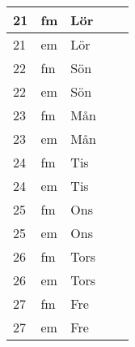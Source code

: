 \documentclass[a4paper]{article}
\begin{document}
\begin{table}[ht!]
\begin{tabular}{lllp{7cm}p{7cm}}
\multicolumn{1}{|l|}{21} & \multicolumn{1}{l|}{fm} & \multicolumn{1}{l|}{Lör} & \multicolumn{1}{l|}{} & \multicolumn{1}{l|}{} \\ \hline
\multicolumn{1}{|l|}{21} & \multicolumn{1}{l|}{em} & \multicolumn{1}{l|}{Lör} & \multicolumn{1}{l|}{} & \multicolumn{1}{l|}{} \\ \hline    

\multicolumn{1}{|l|}{22} & \multicolumn{1}{l|}{fm} & \multicolumn{1}{l|}{Sön} & \multicolumn{1}{l|}{} & \multicolumn{1}{l|}{} \\ \hline
\multicolumn{1}{|l|}{22} & \multicolumn{1}{l|}{em} & \multicolumn{1}{l|}{Sön} & \multicolumn{1}{l|}{} & \multicolumn{1}{l|}{} \\ \hline    

\multicolumn{1}{|l|}{23} & \multicolumn{1}{l|}{fm} & \multicolumn{1}{l|}{Mån} & \multicolumn{1}{l|}{} & \multicolumn{1}{l|}{} \\ \hline
\multicolumn{1}{|l|}{23} & \multicolumn{1}{l|}{em} & \multicolumn{1}{l|}{Mån} & \multicolumn{1}{l|}{} & \multicolumn{1}{l|}{} \\ \hline    

\multicolumn{1}{|l|}{24} & \multicolumn{1}{l|}{fm} & \multicolumn{1}{l|}{Tis} & \multicolumn{1}{l|}{} & \multicolumn{1}{l|}{} \\ \hline
\multicolumn{1}{|l|}{24} & \multicolumn{1}{l|}{em} & \multicolumn{1}{l|}{Tis} & \multicolumn{1}{l|}{} & \multicolumn{1}{l|}{} \\ \hline    

\multicolumn{1}{|l|}{25} & \multicolumn{1}{l|}{fm} & \multicolumn{1}{l|}{Ons} & \multicolumn{1}{l|}{} & \multicolumn{1}{l|}{} \\ \hline
\multicolumn{1}{|l|}{25} & \multicolumn{1}{l|}{em} & \multicolumn{1}{l|}{Ons} & \multicolumn{1}{l|}{} & \multicolumn{1}{l|}{} \\ \hline    

\multicolumn{1}{|l|}{26} & \multicolumn{1}{l|}{fm} & \multicolumn{1}{l|}{Tors} & \multicolumn{1}{l|}{} & \multicolumn{1}{l|}{} \\ \hline
\multicolumn{1}{|l|}{26} & \multicolumn{1}{l|}{em} & \multicolumn{1}{l|}{Tors} & \multicolumn{1}{l|}{} & \multicolumn{1}{l|}{} \\ \hline    

\multicolumn{1}{|l|}{27} & \multicolumn{1}{l|}{fm} & \multicolumn{1}{l|}{Fre} & \multicolumn{1}{l|}{} & \multicolumn{1}{l|}{} \\ \hline
\multicolumn{1}{|l|}{27} & \multicolumn{1}{l|}{em} & \multicolumn{1}{l|}{Fre} & \multicolumn{1}{l|}{} & \multicolumn{1}{l|}{} \\ \hline    


\end{tabular}
\end{table}
\end{document}
